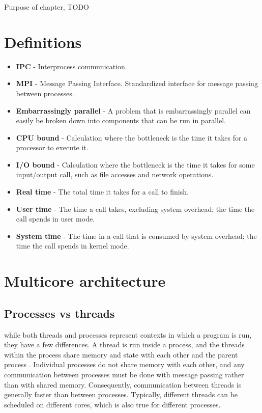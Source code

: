 Purpose of chapter, TODO

\section{Definitions}
\begin{itemize}
  \item \textbf{IPC} - Interprocess communication.
  \item \textbf{MPI} - Message Passing Interface. Standardized interface for message passing between processes.
  \item \textbf{Embarrassingly parallel} - A problem that is embarrassingly parallel can easily be broken down into components that
    can be run in parallel. %
  \item \textbf{CPU bound} - Calculation where the bottleneck is the time it takes for a processor to execute it.
  \item \textbf{I/O bound} - Calculation where the bottleneck is the time it takes for some input/output call, such as file accesses
    and network operations.
  \item \textbf{Real time} - The total time it takes for a call to finish.
  \item \textbf{User time} - The time a call takes, excluding system overhead; the time the call spends in user mode.
  \item \textbf{System time} - The time in a call that is consumed by system overhead; the time the call spends in kernel mode.
\end{itemize}

\section{Multicore architecture} %
\subsection{Processes vs threads}
while both threads and processes represent contexts in which a program is run, they have a few differences. A thread is run inside
a process, and the threads within the process share memory and state with each other and the parent
process \cite{singh_2013_parallel_padpwprfmm}. Individual processes do not share memory with each other, and any
communication between processes must be done with message passing rather than with shared memory. Consequently, communication
between threads is generally faster than between processes.
Typically, different threads can be scheduled on different cores, which is also true for different processes. %

